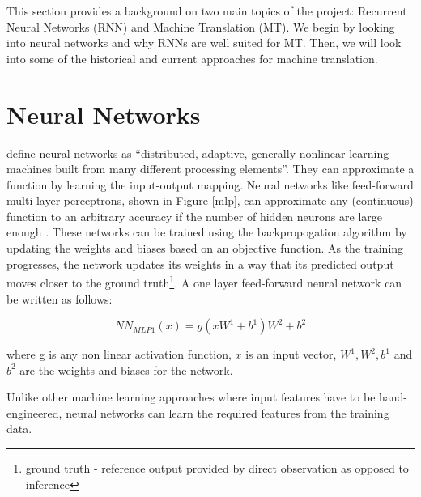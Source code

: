 This section provides a background on two main topics of the project: Recurrent Neural Networks (RNN) and Machine Translation (MT). We begin by looking into neural networks and why RNNs are well suited for MT. Then, we will look into some of the historical and current approaches for machine translation.

\section{Neural Networks}
\cite{rojas2013neural} define neural networks as ``distributed, adaptive, generally nonlinear learning  machines built from many different processing elements''. They can approximate a function by learning the input-output mapping. Neural networks like feed-forward multi-layer perceptrons, shown in Figure \ref{mlp}, can approximate any (continuous) function to an arbitrary accuracy if the number of hidden neurons are large enough \citep{hornik1989multilayer}. These networks can be trained using the backpropogation algorithm \citep{rumelhart1988learning} by updating the weights and biases based on an objective function. As the training progresses, the network updates its weights in a way that its predicted output moves closer to the ground truth\footnote{ground truth - reference output provided by direct observation as opposed to inference}. A one layer feed-forward neural network can be written as follows:


\begin{equation}
NN_{MLP1} (x) = g(xW^1 + b^1 )W^2 + b^2
\end{equation}

where g is any non linear activation function, $x$ is an input vector, $W^1, W^2, b^1$ and  $b^2$ are the weights and biases for the network.

Unlike other machine learning approaches where input features have to be hand-engineered, neural networks can learn the required features from the training data. 


